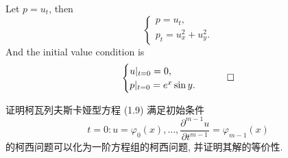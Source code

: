 \begin{solution}
  Let $p=u_t$, then
  \[\begin{cases}
    p = u_t, \\
    p_t = u_x^2 + u_y^2.
  \end{cases}\]
  And the initial value condition is
  \[\begin{cases}
    u|_{t=0} = 0, \\
    p|_{t=0} = e^x \sin y.
  \end{cases}\qedhere\]
\end{solution}


\begin{exercise}
  证明柯瓦列夫斯卡娅型方程 (1.9) 满足初始条件
  \begin{equation}
    t=0: u=\varphi_0(x),\ldots, \frac{\partial^{m-1}u}{\partial t^{m-1}} = \varphi_{m-1}(x) \tag{$\star$}
  \end{equation}
  的柯西问题可以化为一阶方程组的柯西问题, 并证明其解的等价性.
\end{exercise}

